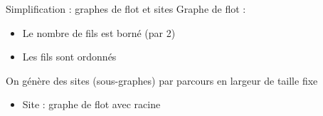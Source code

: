 \documentclass{beamer}
\begin{document}
\begin{frame}{Simplification : graphes de flot et sites}
Graphe de flot :
\begin{itemize}
 \item Le nombre de fils est borné (par 2)
 \item Les fils sont ordonnés
\end{itemize}
On génère des sites (sous-graphes) par parcours en largeur de taille fixe
\begin{itemize}
 \item Site : graphe de flot avec racine
\end{itemize}


% 


\end{frame}
\end{document}
